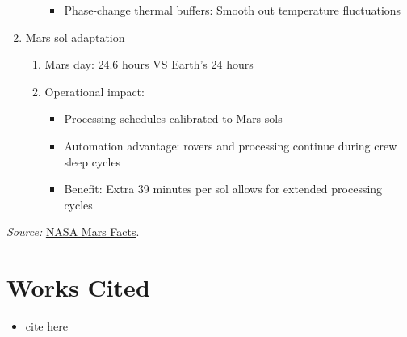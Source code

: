 \documentclass[12pt, a4paper]{article}
\begin{document}
\begin{enumerate}
\begin{enumerate}
\begin{itemize}
            \item Phase-change thermal buffers: Smooth out temperature fluctuations
        \end{itemize}
    \end{enumerate}
    \item Mars sol adaptation
    \begin{enumerate}
        \item Mars day: 24.6 hours VS Earth's 24 hours
        \item Operational impact:
        \begin{itemize}
            \item Processing schedules calibrated to Mars sols
            \item Automation advantage: rovers and processing continue during crew sleep cycles
            \item Benefit: Extra 39 minutes per sol allows for extended processing cycles
        \end{itemize}
    \end{enumerate}

\end{enumerate}

\noindent\textit{Source:} \href{https://science.nasa.gov/mars/facts/}{NASA Mars Facts}.

\newpage 
\section*{Works Cited}
\begin{itemize}
    \item cite here
\end{itemize}
\end{document}
